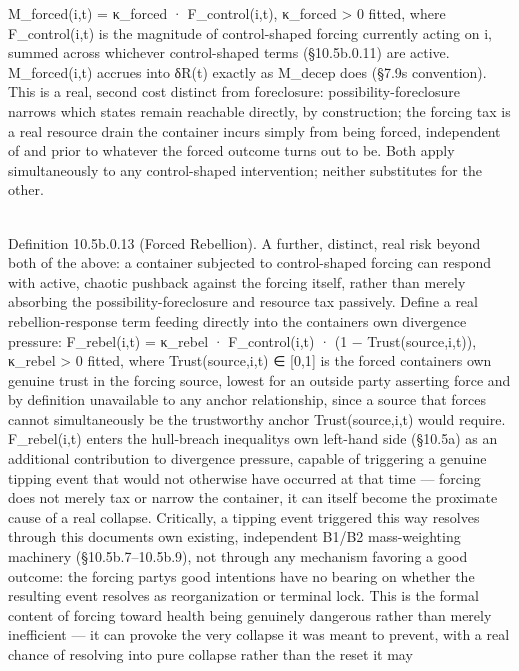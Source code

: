 \documentclass[
]{article}
\begin{document}
M\_forced(i,t) = κ\_forced · F\_control(i,t), κ\_forced \textgreater{} 0
fitted, where F\_control(i,t) is the magnitude of control-shaped forcing
currently acting on i, summed across whichever control-shaped terms
(§10.5b.0.11) are active. M\_forced(i,t) accrues into δR(t) exactly as
M\_decep does (§7.9\textquotesingle s convention). This is a real,
second cost distinct from foreclosure: possibility-foreclosure narrows
which states remain reachable directly, by construction; the forcing tax
is a real resource drain the container incurs simply from being forced,
independent of and prior to whatever the forced outcome turns out to be.
Both apply simultaneously to any control-shaped intervention; neither
substitutes for the other.\\
\strut \\
Definition 10.5b.0.13 (Forced Rebellion). A further, distinct, real risk
beyond both of the above: a container subjected to control-shaped
forcing can respond with active, chaotic pushback against the forcing
itself, rather than merely absorbing the possibility-foreclosure and
resource tax passively. Define a real rebellion-response term feeding
directly into the container\textquotesingle s own divergence pressure:
F\_rebel(i,t) = κ\_rebel · F\_control(i,t) · (1 − Trust(source,i,t)),
κ\_rebel \textgreater{} 0 fitted, where Trust(source,i,t) ∈ {[}0,1{]} is
the forced container\textquotesingle s own genuine trust in the forcing
source, lowest for an outside party asserting force and by definition
unavailable to any anchor relationship, since a source that forces
cannot simultaneously be the trustworthy anchor Trust(source,i,t) would
require. F\_rebel(i,t) enters the hull-breach
inequality\textquotesingle s own left-hand side (§10.5a) as an
additional contribution to divergence pressure, capable of triggering a
genuine tipping event that would not otherwise have occurred at that
time --- forcing does not merely tax or narrow the container, it can
itself become the proximate cause of a real collapse. Critically, a
tipping event triggered this way resolves through this
document\textquotesingle s own existing, independent B1/B2
mass-weighting machinery (§10.5b.7--10.5b.9), not through any mechanism
favoring a good outcome: the forcing party\textquotesingle s good
intentions have no bearing on whether the resulting event resolves as
reorganization or terminal lock. This is the formal content of forcing
toward health being genuinely dangerous rather than merely inefficient
--- it can provoke the very collapse it was meant to prevent, with a
real chance of resolving into pure collapse rather than the reset it may
\end{document}
